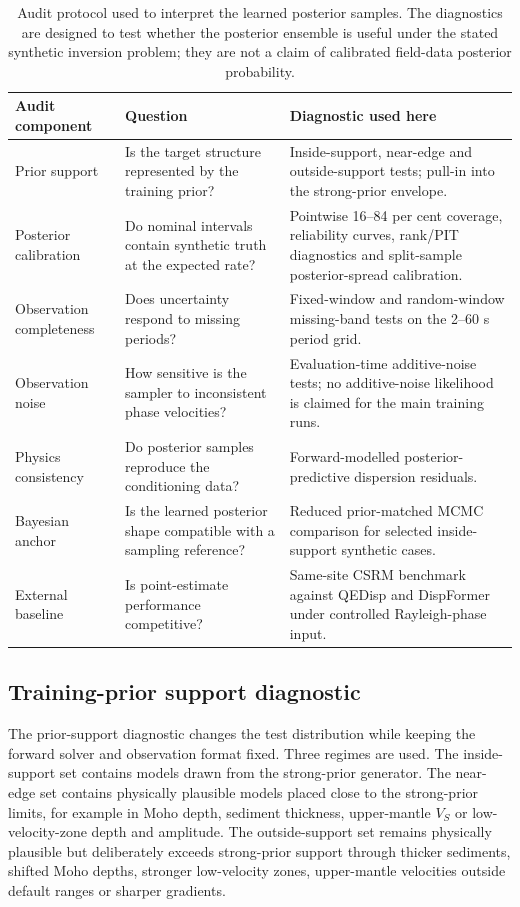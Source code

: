 \documentclass[referee]{gji}
\begin{document}
\begin{table}
\caption{Audit protocol used to interpret the learned posterior samples. The diagnostics are designed to test whether the posterior ensemble is useful under the stated synthetic inversion problem; they are not a claim of calibrated field-data posterior probability.}
\label{tab:auditprotocol}
\centering
\begin{tabular}{@{}p{}p{}p{}@{}}
\toprule
Audit component & Question & Diagnostic used here \\
\midrule
Prior support & Is the target structure represented by the training prior? & Inside-support, near-edge and outside-support tests; pull-in into the strong-prior envelope. \\
Posterior calibration & Do nominal intervals contain synthetic truth at the expected rate? & Pointwise 16--84 per cent coverage, reliability curves, rank/PIT diagnostics and split-sample posterior-spread calibration. \\
Observation completeness & Does uncertainty respond to missing periods? & Fixed-window and random-window missing-band tests on the 2--60 s period grid. \\
Observation noise & How sensitive is the sampler to inconsistent phase velocities? & Evaluation-time additive-noise tests; no additive-noise likelihood is claimed for the main training runs. \\
Physics consistency & Do posterior samples reproduce the conditioning data? & Forward-modelled posterior-predictive dispersion residuals. \\
Bayesian anchor & Is the learned posterior shape compatible with a sampling reference? & Reduced prior-matched MCMC comparison for selected inside-support synthetic cases. \\
External baseline & Is point-estimate performance competitive? & Same-site CSRM benchmark against QEDisp and DispFormer under controlled Rayleigh-phase input. \\
\bottomrule
\end{tabular}
\end{table}

\subsection{Training-prior support diagnostic}

The prior-support diagnostic changes the test distribution while keeping the forward solver and observation format fixed. Three regimes are used. The inside-support set contains models drawn from the strong-prior generator. The near-edge set contains physically plausible models placed close to the strong-prior limits, for example in Moho depth, sediment thickness, upper-mantle $V_S$ or low-velocity-zone depth and amplitude. The outside-support set remains physically plausible but deliberately exceeds strong-prior support through thicker sediments, shifted Moho depths, stronger low-velocity zones, upper-mantle velocities outside default ranges or sharper gradients.
\end{document}
